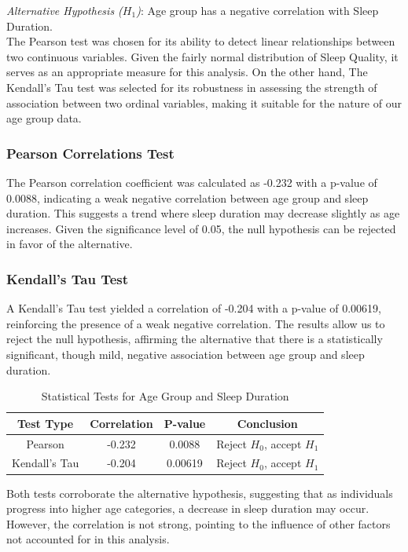 \documentclass[conference]{IEEEtran}
\begin{document}
\textit{Alternative Hypothesis (\(H_1\))}: Age group has a negative correlation with Sleep Duration.\\
The Pearson test was chosen for its ability to detect linear relationships between two continuous variables. Given the fairly normal distribution of Sleep Quality, it serves as an appropriate measure for this analysis. On the other hand, The Kendall’s Tau test was selected for its robustness in assessing the strength of association between two ordinal variables, making it suitable for the nature of our age group data.


\subsubsection*{Pearson Correlations Test}
The Pearson correlation coefficient was calculated as -0.232 with a p-value of 0.0088, indicating a weak negative correlation between age group and sleep duration. This suggests a trend where sleep duration may decrease slightly as age increases. Given the significance level of 0.05, the null hypothesis can be rejected in favor of the alternative.

\subsubsection*{Kendall’s Tau Test}
A Kendall’s Tau test yielded a correlation of -0.204 with a p-value of 0.00619, reinforcing the presence of a weak negative correlation. The results allow us to reject the null hypothesis, affirming the alternative that there is a statistically significant, though mild, negative association between age group and sleep duration.

\begin{table}[ht]
\centering
\caption{Statistical Tests for Age Group and Sleep Duration}
\label{tab:hypothesis2}
\begin{tabular}{|c|c|c|c|}
\hline
\textbf{Test Type} & \textbf{Correlation} & \textbf{P-value} & \textbf{Conclusion} \\
\hline
Pearson & -0.232 & 0.0088 & Reject \(H_0\), accept \(H_1\) \\
\hline
Kendall’s Tau & -0.204 & 0.00619 & Reject \(H_0\), accept \(H_1\) \\
\hline
\end{tabular}
\end{table}

Both tests corroborate the alternative hypothesis, suggesting that as individuals progress into higher age categories, a decrease in sleep duration may occur. However, the correlation is not strong, pointing to the influence of other factors not accounted for in this analysis.
\end{document}
